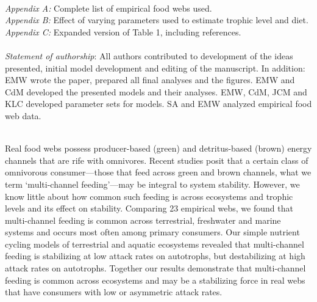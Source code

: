 \documentclass[12pt,a4paper,oneside]{article}
\begin{document}
\\
\noindent \emph{Appendix A:} Complete list of empirical food webs used.\\
\noindent \emph{Appendix B:} Effect of varying parameters used to
estimate trophic level and diet. 
\noindent \emph{Appendix C:} Expanded version of Table 1, including references. \\
\\
\noindent \emph{Statement of authorship}: All authors contributed to development of the ideas presented, initial model development and editing of the manuscript. In addition: EMW wrote the paper, prepared all final analyses and the figures. EMW and CdM developed the presented models and their analyses. EMW, CdM, JCM and KLC developed parameter sets for models. SA and EMW analyzed empirical food web data. 

\pagebreak
\linenumbers
\modulolinenumbers[2]

\\
\noindent Real food webs possess producer-based (green) and detritus-based (brown) energy channels that are rife with omnivores. Recent studies posit that a certain class of omnivorous consumer---those that feed across green and brown channels, what we term `multi-channel feeding'---may be integral to system stability. However, we know little about how common such feeding is across ecosystems and trophic levels and its effect on stability. Comparing 23 empirical webs, we found that multi-channel feeding is common across terrestrial, freshwater and marine systems and occurs most often among primary consumers. Our simple nutrient cycling models of terrestrial and aquatic ecosystems revealed that multi-channel feeding is stabilizing at low attack rates on autotrophs, but destabilizing at high attack rates on autotrophs. Together our results demonstrate that multi-channel feeding is common across ecosystems and may be a stabilizing force in real webs that have consumers with low or asymmetric attack rates.
\end{document}
